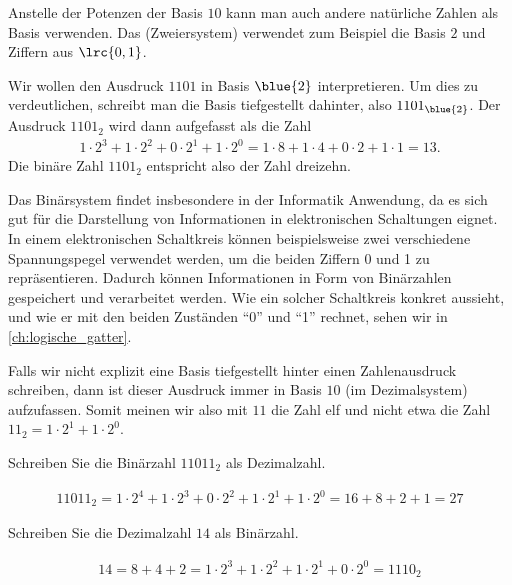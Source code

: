 Anstelle der Potenzen der Basis $10$ kann man auch andere natürliche Zahlen als Basis verwenden.
Das  (Zweiersystem) verwendet zum Beispiel die Basis $2$ und
Ziffern aus $\lrc{0,1}$.
\begin{myexample}
Wir wollen den Ausdruck $1101$ in Basis $\blue{2}$ interpretieren. Um dies zu verdeutlichen, schreibt man die Basis
tiefgestellt dahinter, also $1101_{\blue{2}}$. Der Ausdruck $1101_2$ wird dann aufgefasst als die Zahl
\begin{align*}
	1\cdot 2^3 + 1\cdot 2^2 + 0\cdot 2^1 + 1\cdot 2^0 = 1\cdot 8 + 1\cdot 4 + 0\cdot 2 + 1\cdot 1 = 13.
\end{align*}
Die binäre Zahl $1101_2$ entspricht also der Zahl dreizehn.
\end{myexample}

Das Binärsystem findet insbesondere in der Informatik Anwendung, da es sich gut für die Darstellung von Informationen in elektronischen Schaltungen eignet. In einem elektronischen Schaltkreis können beispielsweise zwei verschiedene Spannungspegel verwendet werden, um die beiden Ziffern 0 und 1 zu repräsentieren. Dadurch können Informationen in Form von Binärzahlen gespeichert und verarbeitet werden. Wie ein solcher Schaltkreis konkret aussieht, und wie er mit den beiden Zuständen \enquote{0} und \enquote{1} rechnet, sehen wir in \cref{ch:logische_gatter}.

\begin{myattention}
	Falls wir nicht explizit eine Basis tiefgestellt hinter einen Zahlenausdruck schreiben, dann ist dieser Ausdruck immer in Basis $10$ (im
	Dezimalsystem) aufzufassen. Somit meinen wir also mit $11$ die Zahl elf und nicht etwa die Zahl $11_2 = 1\cdot 2^1 +
		1\cdot 2^0$.
\end{myattention}

\begin{myexercise}
	Schreiben Sie die Binärzahl $11011_2$ als Dezimalzahl.
	\begin{myanswer}
		\begin{align*}
			11011_2 = 1\cdot 2^4 + 1\cdot 2^3 + 0\cdot 2^2 + 1\cdot 2^1 + 1\cdot 2^0 = 16 + 8 + 2 + 1 = 27
		\end{align*}
	\end{myanswer}
\end{myexercise}

\begin{myexercise}
	Schreiben Sie die Dezimalzahl $14$ als Binärzahl.
	\begin{myanswer}
		\begin{align*}
			14 = 8 + 4 + 2 = 1\cdot 2^3 + 1\cdot 2^2 + 1\cdot 2^1 + 0\cdot 2^0 = 1110_2
		\end{align*}
	\end{myanswer}
\end{myexercise}

